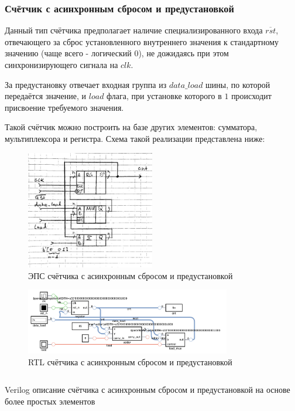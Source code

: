 \documentclass[a4paper]{article}
\begin{document}
  \subsubsection{Счётчик с асинхронным сбросом и предустановкой}
 
  Данный тип счётчика предполагает наличие специализированного входа $\overline{rst}$,
  отвечающего за сброс установленного внутреннего значения к стандартному
  значению (чаще всего - логический 0), не дожидаясь при этом синхронизирующего
  сигнала на $clk$.

  За предустановку отвечает входная группа из $data\_load$ шины, по которой
  передаётся значение, и $load$ флага, при установке которого в $1$ происходит
  присвоение требуемого значения.

  Такой счётчик можно построить на базе других элементов: сумматора, мультиплексора
  и регистра. Схема такой реализации представлена ниже:

  \begin{figure}[H]
    \centering
    \includegraphics[width=0.5\textwidth]{lab_31}
    \caption{ЭПС счётчика с асинхронным сбросом и предустановкой}
  \end{figure}

  \begin{figure}[H]
    \centering
    \includegraphics[width=0.8\textwidth]{lab_32}
    \caption{RTL счётчика с асинхронным сбросом и предустановкой}
  \end{figure}

  \begin{listing}[H]
    \inputminted{verilog}{../chapter_6/cnt_load/counter.v}
    \caption{Verilog описание счётчика с асинхронным сбросом и предустановкой на основе более простых элементов}
  \end{listing}
\end{document}

